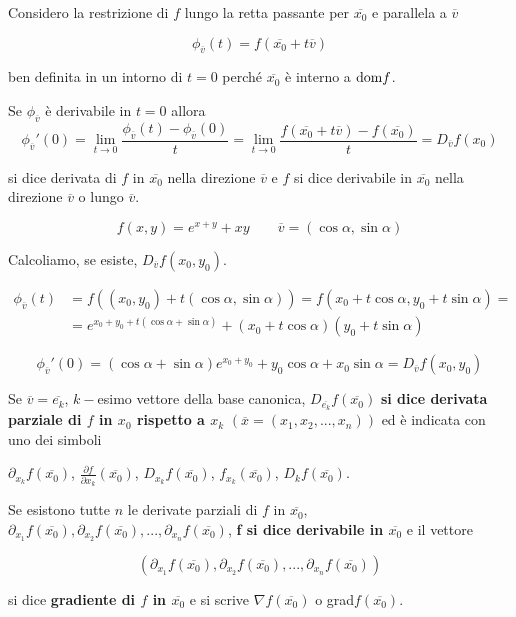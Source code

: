 Considero la restrizione di $f$ lungo la retta passante per $\overline{x_0}$ e parallela a $\overline{v}$

$$\phi_{\overline{v}}(t)=f(\overline{x_0}+t\overline{v})$$

ben definita in un intorno di $t=0$ perché $\overline{x_0}$ è interno a $\mathrm{dom} f$.


\begin{definition}
	Se $\phi_{\overline{v}}$ è derivabile in $t=0$ allora 
	\begin{equation*}
		\phi_{\overline{v}}'(0)=\lim_{t\rightarrow0}\frac{\phi_{\overline{v}}(t)-\phi_{\overline{v}}(0)}{t}=\lim_{t\rightarrow 0}\frac{f(\overline{x_0}+t\overline{v})-f(\overline{x_0})}{t}=D_{\overline{v}}f(x_0)
	\end{equation*}
	
	si dice derivata di $f$ in $\overline{x_0}$ nella direzione $\overline{v}$ e $f$ si dice derivabile in $\overline{x_0}$ nella direzione $\overline{v}$ o lungo $\overline{v}$.
\end{definition}


\begin{exbar}
	$$f(x,y)=e^{x+y}+xy \qquad \overline{v}=(\cos\alpha,\sin\alpha)$$
	
	Calcoliamo, se esiste, $D_{\overline{v}}f(x_0,y_0)$.
	
	\begin{align*} 
		\phi_{\overline{v}}(t) &=f((x_0,y_0)+t(\cos\alpha,\sin\alpha)) =f(x_0+t\cos\alpha,y_0+t\sin\alpha)=
		\\
		&=e^{x_0+y_0+t(\cos\alpha+\sin\alpha)}+(x_0+t\cos\alpha)(y_0+t\sin\alpha)
	\end{align*}
	
	$$\phi_{\overline{v}}'(0)=(\cos\alpha+\sin\alpha)e^{x_0+y_0}+y_0\cos\alpha+x_0\sin\alpha=D_{\overline{v}}f(x_0,y_0)$$
\end{exbar}


\begin{definition}
	Se $\overline{v}=\overline{e_k}$, $k-$esimo vettore della base canonica, $D_{\overline{e_k}}f(\overline{x_0})$ \textbf{si dice derivata parziale di $f$ in $x_0$ rispetto a $x_k$} {\color{teal}$(\overline{x}=(x_1,x_2,...,x_n))$} ed è indicata con uno dei simboli 
	
	$\partial_{x_k}f(\overline{x_0})$, $\frac{\partial f}{\partial x_k}(\overline{x_0})$, $D_{x_k}f(\overline{x_0})$, $f_{x_k}(\overline{x_0})$, $D_kf(\overline{x_0})$.
	
	Se esistono tutte $n$ le derivate parziali di $f$ in $\overline{x_0}$, $\partial_{x_1}f(\overline{x_0}),\partial_{x_2}f(\overline{x_0}),...,\partial_{x_n}f(\overline{x_0})$, \textbf{f si dice derivabile in $\overline{x_0}$} e il vettore 
	
	$$(\partial_{x_1}f(\overline{x_0}),\partial_{x_2}f(\overline{x_0}),...,\partial_{x_n}f(\overline{x_0}))$$
	
	si dice \textbf{gradiente di $f$ in $\overline{x_0}$} e si scrive $\nabla f(\overline{x_0})$ o grad$f(\overline{x_0})$.
\end{definition}


